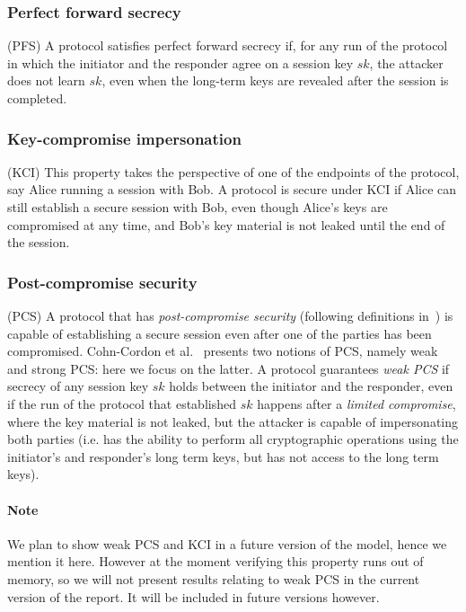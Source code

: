 \subsubsection{Perfect forward secrecy} (PFS) A protocol satisfies perfect forward
secrecy if, for any run of the protocol in which the initiator and the responder
agree on a session key $sk$, the attacker does not learn $sk$, even when the
long-term keys are revealed after the session is completed.

\subsubsection{Key-compromise impersonation} (KCI) This property takes the perspective of one
of the endpoints of the protocol, say Alice running a session with Bob. A
protocol is secure under KCI if Alice can still establish a secure session with
Bob, even though Alice's keys are compromised at any time, and Bob's key
material is not leaked until the end of the session.

\subsubsection{Post-compromise security} (PCS) A protocol that has
\emph{post-compromise security} (following definitions in~\cite{cohn2016post})
is capable of establishing a secure session even after one of the parties has
been compromised. Cohn-Cordon et al.~\cite{cohn2016post} presents two notions of
PCS, namely weak and strong PCS: here we focus on the latter.
%
A protocol guarantees \emph{weak PCS} if secrecy of any session key $sk$ holds
between the initiator and the responder, even if the run of the protocol that
established $sk$ happens after a \emph{limited compromise}, where the key
material is not leaked, but the attacker is capable of impersonating both
parties (i.e. has the ability to perform all cryptographic operations using the
initiator's and responder's long term keys, but has not access to the long term
keys).

\paragraph{Note} We plan to show weak PCS and KCI in a future version of the model,
hence we mention it here. However at the moment verifying this property runs out
of memory, so we will not present results relating to weak PCS in the current
version of the report. It will be included in future versions however.

